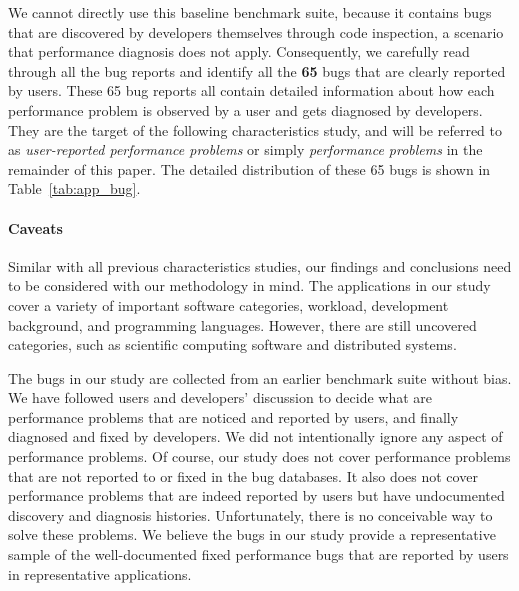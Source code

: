 We cannot directly use this baseline benchmark suite, because it contains
bugs that are discovered by developers themselves through code inspection, a
scenario that performance diagnosis does not apply.
Consequently, we carefully read through all the bug reports and identify all 
the \textbf{65} bugs that are clearly reported by users.
These 65 bug reports all contain detailed information about how each 
performance problem is observed by a user and gets diagnosed by developers.
They are the target of the following characteristics study, and will be 
referred to as \textit{user-reported performance problems} or 
simply \textit{performance problems} in the remainder of this paper.
The detailed distribution of these 65 bugs is shown in Table~\ref{tab:app_bug}.




\paragraph{Caveats} 
Similar with all previous characteristics studies, our findings and 
conclusions need to be considered with our methodology in mind. 
The applications in our study cover a variety of important software categories, 
workload, development background, and programming languages. However, there are
still uncovered categories, such as scientific computing software and 
distributed systems.

The bugs in our study are collected from an earlier benchmark suite 
\citep{PerfBug} without bias. 
We have followed users and developers' discussion to decide what are 
performance problems that are noticed and reported by users, and finally
diagnosed and fixed by developers.
We did not intentionally ignore any aspect of performance problems. 
Of course, our study does not cover performance problems that are 
not reported to or fixed in the bug databases. It also does not cover
performance problems that are indeed reported by users but have undocumented
discovery and diagnosis histories.
Unfortunately, there is no conceivable way to solve these problems.
We believe the bugs in our study provide a representative sample of the 
well-documented fixed
performance bugs that are reported by users in representative applications.
